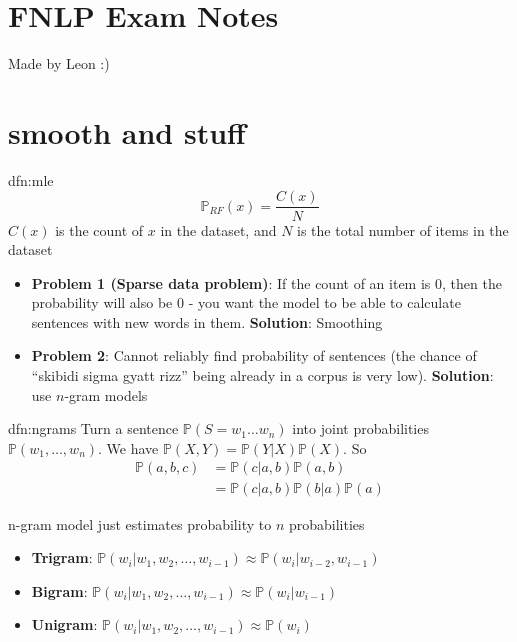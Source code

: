 \documentclass[landscape, 8pt]{extarticle}
\begin{document}
\setlength{\abovedisplayskip}{3.5pt}
\setlength{\belowdisplayskip}{3.5pt}
\setlength{\abovedisplayshortskip}{3.5pt}
\setlength{\belowdisplayshortskip}{3.5pt}

\begin{multicols}{3}
\raggedcolumns


\section*{\huge FNLP Exam Notes}
Made by Leon :) 
\vspace{-5pt}
\section{smooth and stuff}

\begin{dfn}{dfn:mle}{}
    \[\mathbb{P}_{RF}(x) = \frac{C(x)}{N}\]
    $C(x)$ is the count of $x$ in the dataset, and $N$ is the total number of items in the dataset

    \begin{itemize}[leftmargin=*]
        \setlength\itemsep{0em}
        \item \textbf{Problem 1 (Sparse data problem)}: If the count of an item is $0$, then the probability will also be $0$ - you want the model to be able to calculate sentences with new words in them. \textbf{Solution}: Smoothing
        \item \textbf{Problem 2}: Cannot reliably find probability of sentences (the chance of ``skibidi sigma gyatt rizz'' being already in a corpus is very low). \textbf{Solution}: use $n$-gram models
    \end{itemize}
\end{dfn}

\begin{dfn}{dfn:ngrams}{}
    Turn a sentence $\mathbb{P}(S = w_{1}\dots w_{n})$ into joint probabilities $\mathbb{P}(w_{1},\dots,w_{n})$. We have $\mathbb{P}(X, Y) = \mathbb{P}(Y | X)\mathbb{P}(X)$. So
    \begin{align*}
        \mathbb{P}(a, b, c) &= \mathbb{P}(c | a,b)\mathbb{P}(a,b)\\
                            &= \mathbb{P}(c | a, b)\mathbb{P}(b|a)\mathbb{P}(a)
    \end{align*}

    n-gram model just estimates probability to $n$ probabilities
    \begin{itemize}[leftmargin=*]
        \setlength\itemsep{0em}
        \item \textbf{Trigram}: $\mathbb{P}(w_{i}|w_{1},w_{2},\dots,w_{i-1}) \approx \mathbb{P}(w_{i}|w_{i-2}, w_{i-1})$
        \item \textbf{Bigram}: $\mathbb{P}(w_{i}|w_{1},w_{2},\dots,w_{i-1}) \approx \mathbb{P}(w_{i}|w_{i-1})$
        \item \textbf{Unigram}: $\mathbb{P}(w_{i}|w_{1},w_{2},\dots,w_{i-1}) \approx \mathbb{P}(w_{i})$
    \end{itemize}


\end{dfn}
\end{multicols}
\end{document}
